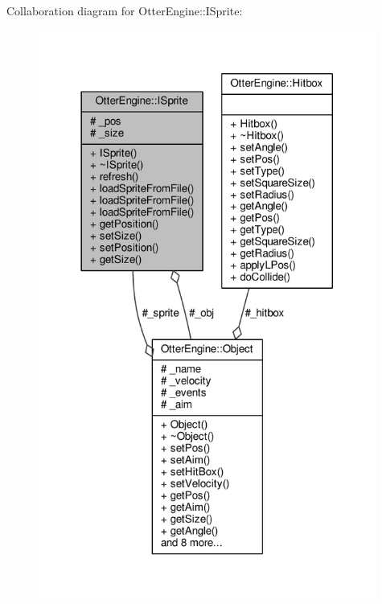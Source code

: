 Collaboration diagram for Otter\+Engine\+:\+:I\+Sprite\+:\nopagebreak
\begin{figure}[H]
\begin{center}
\leavevmode
\includegraphics[width=314pt]{d1/dbf/class_otter_engine_1_1_i_sprite__coll__graph}
\end{center}
\end{figure}
